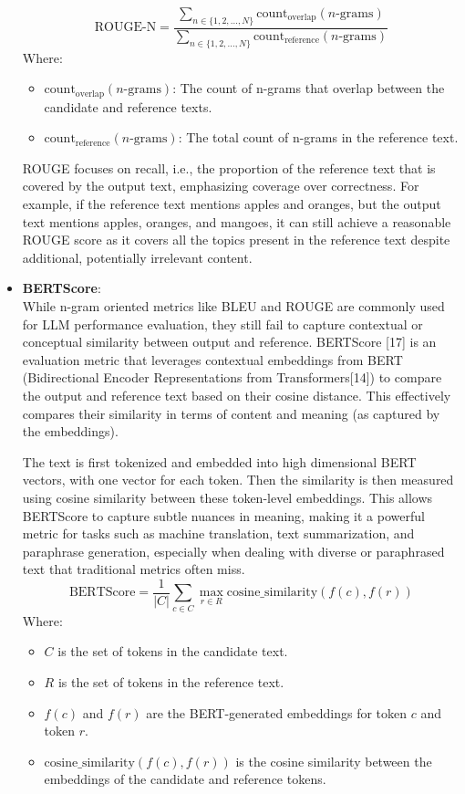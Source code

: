 \documentclass[12pt]{article}
\begin{document}
\begin{itemize}
        \[
            \text{ROUGE-N} = \frac{\sum_{n \in \{1, 2, \dots, N\}} \text{count}_{\text{overlap}}(n\text{-grams})}{\sum_{n \in \{1, 2, \dots, N\}} \text{count}_{\text{reference}}(n\text{-grams})}
        \]
        Where:
        \begin{itemize}
            \item \(\text{count}_{\text{overlap}}(n\text{-grams})\): The count of n-grams that overlap between the candidate and reference texts.
            \item \(\text{count}_{\text{reference}}(n\text{-grams})\): The total count of n-grams in the reference text.
        \end{itemize}

        ROUGE focuses on recall, i.e., the proportion of the reference text that is covered by the output text, emphasizing coverage over correctness. For example, if the reference text mentions apples and oranges, but the output text mentions apples, oranges, and mangoes, it can still achieve a reasonable ROUGE score as it covers all the topics present in the reference text despite additional, potentially irrelevant content.


        \item \textbf{BERTScore}: \\
        While n-gram oriented metrics like BLEU and ROUGE are commonly used for LLM performance evaluation, they still fail to capture contextual or conceptual similarity between output and reference. BERTScore [17] is an evaluation metric that leverages contextual embeddings from BERT (Bidirectional Encoder Representations from Transformers[14]) to compare the output and reference text based on their cosine distance. This effectively compares their similarity in terms of content and meaning (as captured by the embeddings).

        The text is first tokenized and embedded into high dimensional BERT vectors, with one vector for each token. Then the similarity is then measured using cosine similarity between these token-level embeddings. This allows BERTScore to capture subtle nuances in meaning, making it a powerful metric for tasks such as machine translation, text summarization, and paraphrase generation, especially when dealing with diverse or paraphrased text that traditional metrics often miss.
        \[
            \text{BERTScore} = \frac{1}{|C|} \sum_{c \in C} \max_{r \in R} \text{cosine\_similarity}(f(c), f(r))
        \]
        Where:
        \begin{itemize}
            \item \( C \) is the set of tokens in the candidate text.
            \item \( R \) is the set of tokens in the reference text.
            \item \( f(c) \) and \( f(r) \) are the BERT-generated embeddings for token \( c \) and token \( r \).
            \item \( \text{cosine\_similarity}(f(c), f(r)) \) is the cosine similarity between the embeddings of the candidate and reference tokens.
        \end{itemize}



\end{itemize}
\end{document}
